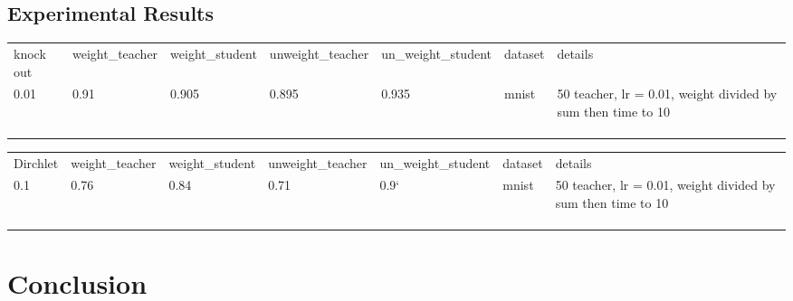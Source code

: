 \documentclass{article}
\theoremstyle{definition}
\begin{document}
\subsection{Experimental Results}
\begin{table}[t]
\begin{tabular}{lllllll}
knock out              & weight\_teacher & weight\_student & unweight\_teacher & un\_weight\_student & dataset & details                                                      \\
 0.01 & 0.91            & 0.905           & 0.895             & 0.935               & mnist   & 50 teacher, lr = 0.01, weight divided by sum then time to 10 \\
                    &                 &                 &                   &                     &         &                                                              \\
                    &                 &                 &                   &                     &         &                                                              \\
                    &                 &                 &                   &                     &         &                                                             
\end{tabular}
\end{table}
\begin{table}[]
\begin{tabular}{lllllll}
Dirchlet           & weight\_teacher & weight\_student & unweight\_teacher & un\_weight\_student & dataset & details                                                      \\
 0.1 & 0.76           & 0.84           & 0.71          & 0.9`             & mnist   & 50 teacher, lr = 0.01, weight divided by sum then time to 10 \\
                    &                 &                 &                   &                     &         &                                                              \\
                    &                 &                 &                   &                     &         &                                                              \\
                    &                 &                 &                   &                     &         &                                                             
\end{tabular}
\end{table}



\section{Conclusion}



\end{document}
